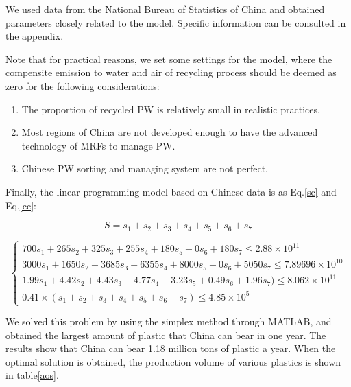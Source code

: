 \documentclass{mcmthesis}
\begin{document}
We used data from the National Bureau of Statistics of China\cite{Country} and obtained parameters closely related to the model. Specific information can be consulted in the appendix.

Note that for practical reasons, we set some settings for the model, where the compensite emission to water and air of recycling process should be deemed as zero for the following considerations:

\begin{enumerate}
	\item The proportion of recycled PW is relatively small in realistic practices. 
	\item Most regions of China are not developed enough to have the advanced technology of MRFs to manage PW.
	\item Chinese PW sorting and managing system are not perfect.
\end{enumerate}

Finally, the linear programming model based on Chinese data is as Eq.\ref{sc} and Eq.\ref{cc}:

\begin{equation}
	S = s_1 + s_2 + s_3 + s_4 + s_5 + s_6 + s_7
	\label{sc}
\end{equation}

\begin{equation}
\label{cc}
\left\{
\begin{aligned}
700s_1+265s_2+325s_3+255s_4+180s_5+0s_6+180s_7\le 2.88\times 10^{11}\\
3000s_1+1650s_2+3685s_3+6355s_4+8000s_5+0s_6+5050s_7\le7.89696\times 10^{10}\\
1.99s_1+4.42s_2+4.43s_3+4.77s_4+3.23s_5+0.49s_6+1.96s_7)\le 8.062\times 10^{11}\\
0.41\times(s_1+s_2+s_3+s_4+s_5+s_6+s_7)\le 4.85\times 10^5
\end{aligned}
\right.
\end{equation}



We solved this problem by using the simplex method through MATLAB, and obtained the largest amount of plastic that China can bear in one year. The results show that China can bear 1.18 million tons of plastic a year. When the optimal solution is obtained, the production volume of various plastics is shown in table\ref{aos}.
\end{document}
